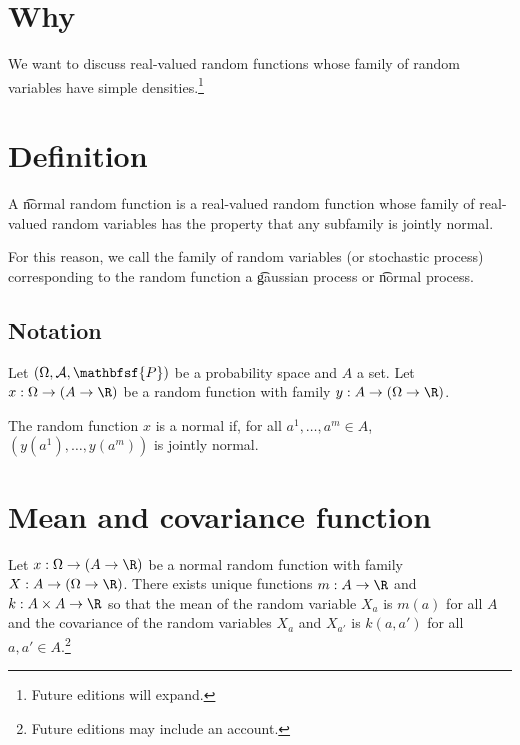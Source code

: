 

\section*{Why}

We want to discuss real-valued random functions whose family of random variables have simple densities.\footnote{Future editions will expand.}

\section*{Definition}

A \t{normal random function} is a real-valued random function whose family of real-valued random variables has the property that any subfamily is jointly normal.

For this reason, we call the family of random variables (or stochastic process) corresponding to the random function a \t{gaussian process} or \t{normal process}.

  \subsection*{Notation}

Let $(\Omega , \mathcal{A} , \mathbfsf{P} )$ be a probability space and $A$ a set.
Let $x: \Omega  \to (A \to \R )$ be a random function with family $y: A \to (\Omega  \to \R )$.

The random function $x$ is a normal if, for all $a^1, \dots , a^m \in A$, $(y(a^1), \dots , y(a^m))$ is jointly normal.

  \section*{Mean and covariance function}

\begin{proposition}
Let $x: \Omega  \to (A \to \R )$ be a normal random function with family $X: A \to (\Omega  \to \R )$.
There exists unique functions $m: A \to \R $ and $k: A \times A \to \R $ so that the mean of the random variable $X_a$ is $m(a)$ for all $A$ and the covariance of the random variables $X_a$ and $X_{a'}$ is $k(a, a')$ for all $a, a' \in A$.\footnote{Future editions may include an account.}
\end{proposition}

